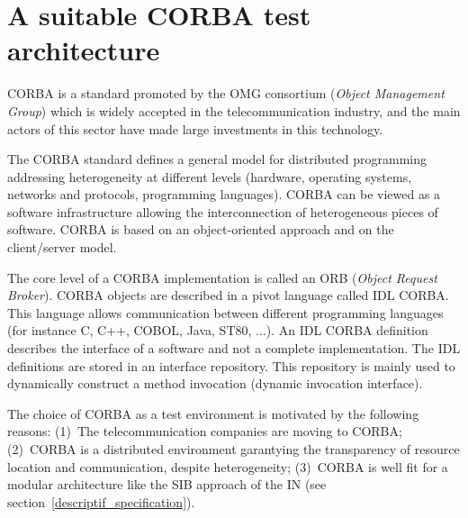 \section{A suitable CORBA test architecture\label{CORBA}}

CORBA is a standard promoted by the OMG consortium (\emph{Object
Management Group}) which is widely accepted in the telecommunication
industry, and the main actors of this sector have made large
investments in this technology.

The CORBA standard defines a general model for distributed programming
addressing heterogeneity at different levels (hardware, operating
systems, networks and protocols, programming languages). CORBA can be
viewed as a software infrastructure allowing the interconnection of
heterogeneous pieces of software. CORBA is based on an object-oriented
approach and on the client/server model.  

The core level of a CORBA implementation is called an ORB
(\emph{Object Request Broker}). CORBA objects are described in a pivot
language called IDL CORBA. This language allows communication between
different programming languages (for instance C, C++, \textsc{COBOL}, Java,
ST80, ...). An IDL CORBA definition describes the interface of a
software and not a complete implementation. The IDL definitions are
stored in an interface repository. This repository is mainly used to
dynamically construct a method invocation (dynamic invocation
interface).

The choice of CORBA as a test environment is motivated by the
following reasons: (1)~The telecommunication companies are moving to
CORBA; (2)~CORBA is a distributed environment garantying the
transparency of resource location and communication, despite
heterogeneity; (3)~CORBA is well fit for a modular architecture like
the SIB approach of the IN (see
section~\ref{descriptif_specification}). 



